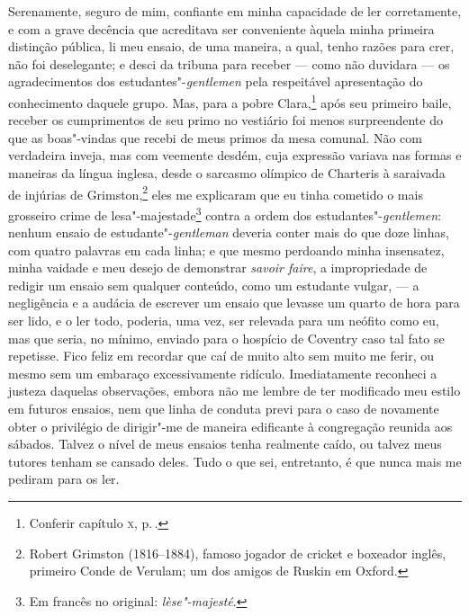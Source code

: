 Serenamente, seguro de mim, confiante em minha capacidade de ler
corretamente, e com a grave decência que acreditava ser conveniente
àquela minha primeira distinção pública, li meu ensaio, de uma maneira,
a qual, tenho razões para crer, não foi deselegante; e desci da tribuna
para receber --- como não duvidara --- os agradecimentos dos
estudantes"-\textit{gentlemen} pela respeitável apresentação do
conhecimento daquele grupo. Mas, para a pobre Clara,\footnote{Conferir
  capítulo \textsc{x}, p.\,\pageref{212}.} após seu primeiro baile, receber os
cumprimentos de seu primo no vestiário foi menos surpreendente do que as
boas"-vindas que recebi de meus primos da mesa comunal. Não com
verdadeira inveja, mas com veemente desdém, cuja expressão variava nas
formas e maneiras da língua inglesa, desde o sarcasmo olímpico de \label{tom}
Charteris à saraivada de injúrias de Grimston,\footnote{Robert Grimston
  (1816--1884), famoso jogador de cricket e boxeador inglês, primeiro Conde de
  Verulam; um dos amigos de Ruskin em Oxford.} eles me
explicaram que eu tinha cometido o mais grosseiro crime de
lesa"-majestade\footnote{Em francês no original: \textit{lèse"-majesté}.} contra a ordem dos estudantes"-\textit{gentlemen}:
nenhum ensaio de estudante"-\textit{gentleman} deveria conter mais do que
doze linhas, com quatro palavras em cada linha; e que mesmo perdoando
minha insensatez, minha vaidade e meu desejo de demonstrar \textit{savoir
faire}, a impropriedade de redigir um ensaio sem qualquer conteúdo, como
um estudante vulgar, --- a negligência e a audácia de escrever um ensaio
que levasse um quarto de hora para ser lido, e o ler todo, poderia, uma
vez, ser relevada para um neófito como eu, mas que seria, no mínimo,
enviado para o hospício de Coventry caso tal fato se repetisse. Fico
feliz em recordar que caí de muito alto sem muito me ferir, ou mesmo sem
um embaraço excessivamente ridículo. Imediatamente reconheci a justeza
daquelas observações, embora não me lembre de ter modificado meu estilo
em futuros ensaios, nem que linha de conduta previ para o caso de
novamente obter o privilégio de dirigir"-me de maneira edificante à
congregação reunida aos sábados. Talvez o nível de meus ensaios tenha
realmente caído, ou talvez meus tutores tenham se cansado deles. Tudo o
que sei, entretanto, é que nunca mais me pediram para os ler.

